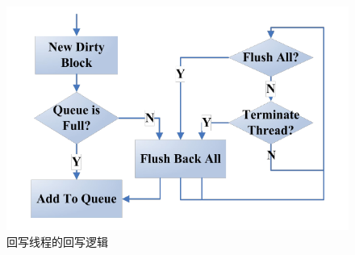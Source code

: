 \begin{figure}[htb]
\centering
\includegraphics[width=0.6\linewidth]{./graph/write-back-thread}
\caption{回写线程的回写逻辑}
\label{fig:write-back-thread}
\end{figure}

